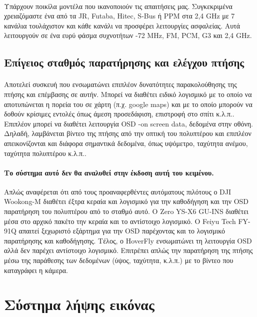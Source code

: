 \documentclass[a4paper, 12pt, twoside]{report}
\begin{document}
{{{{{{			\paragraph{}{Υπάρχουν ποικίλα μοντέλα που ικανοποιούν τις απαιτήσεις μας. Συγκεκριμένα χρειαζόμαστε ένα από τα JR, Futaba, Hitec, S-Bus ή PPM στα 2,4 GHz με 7 κανάλια τουλάχιστον και κάθε κανάλι να προσφέρει λειτουργίες ασφαλείας. Αυτά λειτουργούν σε ένα ευρύ φάσμα συχνοτήτων -72 MHz, FM, PCM, G3 και 2,4 GHz.
			}
			
		\subsection{Επίγειος σταθμός παρατήρησης και ελέγχου πτήσης}
			\paragraph{}{Αποτελεί συσκευή που ενσωματώνει επιπλέον δυνατότητες παρακολούθησης της πτήσης και επέμβασης σε αυτήν. Μπορεί να διαθέτει ειδικό λογισμικό με το οποίο να αποτυπώνεται η πορεία του σε χάρτη (π.χ. google maps) και με το οποίο μπορούν να δοθούν κρίσιμες εντολές όπως άμεση προσεδάφιση, επιστροφή στο σπίτι κ.λ.π.. Επιπλέον μπορεί να διαθέτει λειτουργία OSD -on screen data, δεδομένα στην οθόνη. Δηλαδή, λαμβάνεται βίντεο της πτήσης από την οπτική του πολυπτέρου και επιπλέον απεικονίζονται και διάφορα σημαντικά δεδομένα, όπως υψόμετρο, ταχύτητα ανέμου, ταχύτητα πολυπτέρου κ.λ.π..
			}
			\paragraph{Το σύστημα αυτό δεν θα αναλυθεί στην έκδοση αυτή του κειμένου.}{Απλώς αναφέρεται ότι από τους προαναφερθέντες αυτόματους πιλότους ο DJI Wookong-M διαθέτει έξτρα κεραία και λογισμικό για την καθοδήγηση και την OSD παρατήρηση του πολυπτέρου από το σταθμό αυτό. Ο Zero YS-X6 GU-INS διαθέτει μέσα στο αρχικό πακέτο την κεραία και το αντίστοιχο λογισμικό. Ο Feiyu Tech FY-91Q απαιτεί ξεχωριστό εξάρτημα για την OSD παρέχοντας και το λογισμικό παρατήρησης και καθοδήγησης. Τέλος, ο HoverFly ενσωματώνει τη λειτουργία OSD αλλά δεν παρέχει αντίστοιχο λογισμικό. Επιτρέπει απλώς την παρατήρηση της πτήσης μέσω της παράθεσης των δεδομένων (ύψος, ταχύτητα, κ.λ.π.) με το βίντεο που καταγράφει η κάμερα.
			}
			
			
		\section{Σύστημα λήψης εικόνας}
		
}}}}}}
\end{document}
